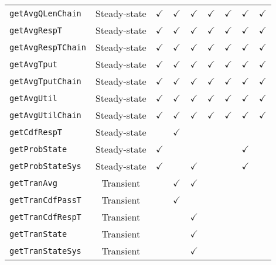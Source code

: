 {\begin{table}[thbp]
\begin{tabular}{|l|c|c|c|c|c|c|c|c|}
\texttt{getAvgQLenChain} & Steady-state 	&$\checkmark$			&$\checkmark$	&  $\checkmark$	 	&  $\checkmark$	 & $\checkmark$	&  $\checkmark$		& $\checkmark$	\\
\texttt{getAvgRespT}	& Steady-state &$\checkmark$			&$\checkmark$	&  $\checkmark$	 	&  $\checkmark$	 & $\checkmark$	&  $\checkmark$		& $\checkmark$	\\
\texttt{getAvgRespTChain}	& Steady-state &$\checkmark$			&$\checkmark$	&  $\checkmark$	 	&  $\checkmark$	 & $\checkmark$	&  $\checkmark$		& $\checkmark$	\\
\texttt{getAvgTput}	& Steady-state &$\checkmark$			&$\checkmark$	&  $\checkmark$	 	&  $\checkmark$	 & $\checkmark$	&  $\checkmark$		& $\checkmark$	\\
\texttt{getAvgTputChain}	& Steady-state &$\checkmark$			&$\checkmark$	&  $\checkmark$	 	&  $\checkmark$	 & $\checkmark$	&  $\checkmark$		& $\checkmark$	\\
\texttt{getAvgUtil}	& Steady-state &$\checkmark$			&$\checkmark$	&  $\checkmark$	 	&  $\checkmark$	 & $\checkmark$	&  $\checkmark$		& $\checkmark$	\\
\texttt{getAvgUtilChain}	& Steady-state &$\checkmark$			&$\checkmark$	&  $\checkmark$	 	&  $\checkmark$	 & $\checkmark$	&  $\checkmark$		& $\checkmark$	\\
\hline
\texttt{getCdfRespT} & Steady-state  	 &	& $\checkmark$	& &	&  & &\\
\texttt{getProbState} & Steady-state  	 &	$\checkmark$ & &	&	 &	& $\checkmark$ & \\	
\texttt{getProbStateSys} & Steady-state   & $\checkmark$	& 	&	 $\checkmark$&	&  & $\checkmark$ & \\
\hline
\texttt{getTranAvg} & Transient  	 &&$\checkmark$	& $\checkmark$	& &	&  & \\
\texttt{getTranCdfPassT} & Transient 	 &	& 	$\checkmark$&	 &	&  && \\
\texttt{getTranCdfRespT} & Transient 	 &	& 	&	$\checkmark$ &	&  && \\
\texttt{getTranState} & Transient	 & &	& $\checkmark$	& &	 && \\
\texttt{getTranStateSys} & Transient	 & &	& $\checkmark$	& &	 && \\
\hline
\end{tabular}
\label{TAB_solver_functions}
\end{table}
}

